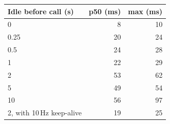 \begin{tabular}{lrr}
\toprule
Idle before call (s) & p50 (ms) & max (ms) \\
\midrule
0 & 8 & 10 \\
0.25 & 20 & 24 \\
0.5 & 24 & 28 \\
1 & 22 & 29 \\
2 & 53 & 62 \\
5 & 49 & 54 \\
10 & 56 & 97 \\
2, with 10\,Hz keep-alive & 19 & 25 \\
\bottomrule
\end{tabular}

